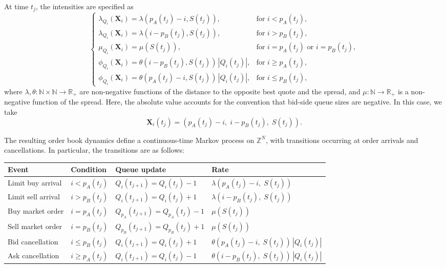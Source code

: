 \documentclass[11pt]{article}
\begin{document}
At time $t_j$, the intensities are specified as
\begin{equation}
\left\{
\begin{array}{ll}
\lambda_{Q_i}(\boldsymbol{X}_i) = \lambda(p_A(t_j) - i, S(t_j)), 
& \text{for } i < p_A(t_j), \\[10pt]
\lambda_{Q_i}(\boldsymbol{X}_i) = \lambda(i - p_B(t_j), S(t_j)), 
& \text{for } i > p_B(t_j), \\[10pt]
\mu_{Q_i}(\boldsymbol{X}_i) = \mu(S(t_j)), 
& \text{for } i = p_A(t_j) \text{ or } i = p_B(t_j), \\[10pt]
\phi_{Q_i}(\boldsymbol{X}_i) = \theta(i - p_B(t_j), S(t_j))\,|Q_i(t_j)|, 
& \text{for } i \geq p_A(t_j), \\[10pt]
\phi_{Q_i}(\boldsymbol{X}_i) = \theta(p_A(t_j) - i, S(t_j))\,|Q_i(t_j)|, 
& \text{for } i \leq p_B(t_j),
\end{array}
\right.
\end{equation}
where $\lambda,\theta:\mathbb{N}\times\mathbb{N}\to\mathbb{R}_+$ are non-negative functions of the distance to the opposite best quote and the spread, and $\mu:\mathbb{N}\to\mathbb{R}_+$ is a non-negative function of the spread. Here, the absolute value accounts for the convention that bid-side queue sizes are negative. In this case, we take
\[
\boldsymbol{X}_i(t_j)=(p_A(t_j)-i,\; i-p_B(t_j),\; S(t_j)).
\]

The resulting order book dynamics define a continuous-time Markov process on $\mathbb{Z}^N$, with transitions occurring at order arrivals and cancellations. In particular, the transitions are as follows:
\begin{table}[h!]
\centering
\renewcommand{\arraystretch}{1.3}
\begin{tabular}{llll}
\toprule
Event & Condition & Queue update & Rate \\
\midrule
Limit buy arrival& $i<p_A(t_j)$ 
& $Q_i(t_{j+1}) = Q_i(t_j)-1$ 
& $\lambda(p_A(t_j)-i,\; S(t_j))$ \\

Limit sell arrival &$i>p_B(t_j)$ 
& $Q_i(t_{j+1}) = Q_i(t_j)+1$ 
& $\lambda(i-p_B(t_j),\; S(t_j))$ \\[0.3em]

Buy market order &$i=p_A(t_j)$ 
& $Q_{p_A}(t_{j+1}) = Q_{p_A}(t_j)-1$ 
& $\mu(S(t_j))$ \\

Sell market order &$i=p_B(t_j)$ 
& $Q_{p_B}(t_{j+1}) = Q_{p_B}(t_j)+1$ 
& $\mu(S(t_j))$ \\[0.3em]

Bid cancellation &$i\le p_B(t_j)$ 
& $Q_i(t_{j+1}) = Q_i(t_j)+1$ 
& $\theta(p_A(t_j)-i,\; S(t_j))\,|Q_i(t_j)|$ \\

Ask cancellation &$i\ge p_A(t_j)$ 
& $Q_i(t_{j+1}) = Q_i(t_j)-1$ 
& $\theta(i-p_B(t_j),\; S(t_j))\,|Q_i(t_j)|$ \\
\bottomrule
\end{tabular}
\label{tab:modelIII_transitions}
\end{table}
\end{document}
